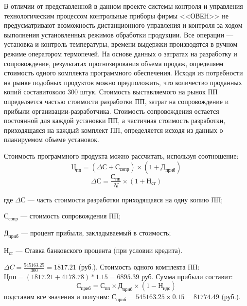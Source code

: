 \begin{par}                                                                 
В отличии от представленной в данном проекте системы контроля и управления 
технологическим процессом контрольные приборы фирмы <<ОВЕН>> не предусматривают
возможность дистанционного управления и контроля за ходом выполнения установленных
режимов обработки продукции. Все операции --- установка и контроль температуры, времени выдержки 
производятся в ручном режиме оператором термопечей. На основе данных  о затратах на разработку и
сопровождение, результатах прогнозирования объема продаж, определяем стоимость одного комплекта
программного обеспечения. Исходя из потребности на рынке подобных продуктов
можно предположить, что количество проданных копий составитоколо 300 штук. Стоимость выставляемого
на рынок ПП определяется частью стоимости разработки ПП, затрат на сопровождение и прибыли
организации-разработчика. Стоимость сопровождения остается постоянной для каждой установки
ПП, а частичная стоимость разработки, приходящаяся на каждый комплект ПП,
определяется исходя из данных о планируемом объеме установок.
\end{par}


Стоимость программного продукта можно рассчитать, используя соотношение:
\begin{equation}
	\textrm{Ц}_\textrm{пп} = (\Delta{}\textrm{С} + \textrm{С}_\textrm{сопр}) \times{} (1 + \textrm{Д}_\textrm{приб})
\end{equation}
\begin{equation}
	\Delta{}\textrm{С} = \frac{\textrm{С}_\textrm{пп}}{N} \times{} (1 + \textrm{Н}_\textrm{ст})
\end{equation}

\begin{ESKDexplanation}                       
	\item[где ] $\Delta{}\textrm{С}$ --- часть стоимости разработки приходящаяся на одну копию ПП;
	\item{} $\textrm{С}_\textrm{сопр}$ --- стоимость сопровождения ПП;
	\item{} $\textrm{Д}_\textrm{приб}$ --- процент прибыли, закладываемый в стоимость;
	\item{} $\textrm{Н}_\textrm{ст}$ --- Ставка банковского процента (при условии кредита).
\end{ESKDexplanation}

$ \Delta{} C = \frac{545163.25}{300} = 1817.21$ (руб.).
Стоимость одного комплекта ПП: $Цпп = (1817.21 +4178.78)*1.15  =  6895.39$ руб.
Сумма прибыли составит:
\begin{equation}
	\textrm{С}_\textrm{приб} = \textrm{С}_\textrm{пп} \times{} \textrm{Д}_\textrm{приб} \times{} (1 - \textrm{Н}_\textrm{ндс})
\end{equation}
подставим все значения и получим: $\textrm{С}_\textrm{приб} = 545163.25 \times{} 0.15 =  81774.49$ (руб.).



